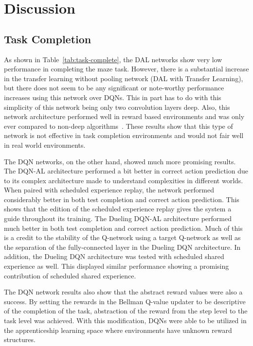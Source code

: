 \documentclass[12pt,american]{report}
\begin{document}
\section{Discussion}

\subsection{Task Completion}
As shown in Table~\ref{tab:task-complete}, the DAL networks show very low performance in completing the maze task.  However, there is a substantial increase in the transfer learning without pooling network (DAL with Transfer Learning), but there does not seem to be any significant or note-worthy performance increases using this network over DQNs.  This in part has to do with this simplicity of this network being only two convolution layers deep.  Also, this network architecture performed well in reward based environments and was only ever compared to non-deep algorithms~\cite{markovikj2014deep}.  These results show that this type of network is not effective in task completion environments and would not fair well in real world environments.  

The DQN networks, on the other hand, showed much more promising results. The DQN-AL architecture performed a bit better in correct action prediction due to its complex architecture made to understand complexities in different worlds. When paired with scheduled experience replay, the network performed considerably better in both test completion and correct action prediction.  This shows that the edition of the scheduled experience replay gives the system a guide throughout its training.  The Dueling DQN-AL architecture performed much better in both test completion and correct action prediction.  Much of this is a credit to the stability of the Q-network using a target Q-network as well as the separation of the fully-connected layer in the Dueling DQN architecture.  In addition, the Dueling DQN architecture was tested with scheduled shared experience as well.  This displayed similar performance showing a promising contribution of scheduled shared experience. 

The DQN network results also show that the abstract reward values were also a success. By setting the rewards in the Bellman Q-value updater to be descriptive of the completion of the task, abstraction of the reward from the step level to the task level was achieved.  With this modification, DQNs were able to be utilized in the apprenticeship learning space where environments have unknown reward structures. 
\end{document}
